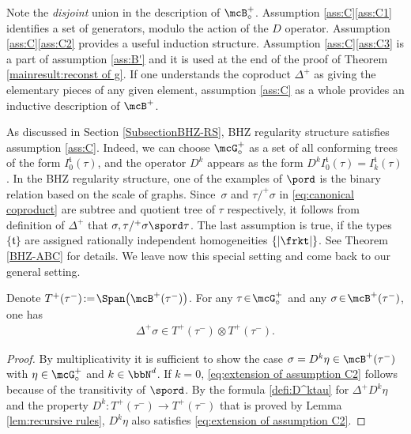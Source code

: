 Note the \emph{disjoint} union in the description of $\mcB_\circ^+$. Assumption \ref{ass:C}\eqref{ass:C1} identifies a set of generators, modulo the action of the $D$ operator. Assumption \ref{ass:C}\eqref{ass:C2} provides a useful induction structure. Assumption \ref{ass:C}\eqref{ass:C3} is a part of assumption \ref{ass:B'} and it is used at the end of the proof of Theorem \ref{mainresult:reconst of g}. If one understands the coproduct $\Delta^+$ as giving the elementary pieces of any given element, assumption \eqref{ass:C} as a whole provides an inductive description of $\mcB^+$.

As discussed in Section \ref{SubsectionBHZ-RS}, BHZ regularity structure satisfies assumption \eqref{ass:C}. Indeed, we can choose $\mcG_\circ^+$ as a set of all conforming trees of the form $I_0^{\mathfrak{t}}(\tau)$, and the operator $D^k$ appears as the form $D^kI_0^{\mathfrak{t}}(\tau)=I_k^{\mathfrak{t}}(\tau)$.
In the BHZ regularity structure, one of the examples of $\pord$ is the binary relation based on the scale of graphs.
Since~$\sigma$ and $\tau/^+\sigma$ in \eqref{eq:canonical coproduct} are subtree and quotient tree of $\tau$ respectively, it follows from definition of $\Delta^+$ that $\sigma,\tau/^+\sigma\spord\tau$.
The last assumption is true, if the types $\{\mathfrak{t}\}$ are assigned rationally independent homogeneities $\{|\frkt|\}$.
See Theorem \ref{BHZ-ABC} for details. We leave now this special setting and come back to our general setting.

\begin{lem}\label{extension of assumption C2}
Denote $T^+(\tau^-)\!:=\!\Span \bigl(\mcB^+(\tau^-)\bigr)$.
For any $\tau\!\in\!\mcG_\circ^+$ and any $\sigma\!\in\!\mcB^+(\tau^-)$, one has
\begin{align}\label{eq:extension of assumption C2}
\Delta^+\sigma\in T^+(\tau^-)\otimes T^+(\tau^-).
\end{align}
\end{lem}

\begin{proof}
By multiplicativity it is sufficient to show the case $\sigma=D^k\eta\in\mcB^+(\tau^-)$ with $\eta\in\mcG_\circ^+$ and $k\in\bbN^d$.
If $k=0$, \eqref{eq:extension of assumption C2} follows because of the transitivity of $\spord$.
By the formula \eqref{defi:D^ktau} for $\Delta^+D^k\eta$ and the property $D^k:T^+(\tau^-)\to T^+(\tau^-)$ that is proved by Lemma \ref{lem:recursive rules}, $D^k\eta$ also satisfies \eqref{eq:extension of assumption C2}.
\end{proof}

